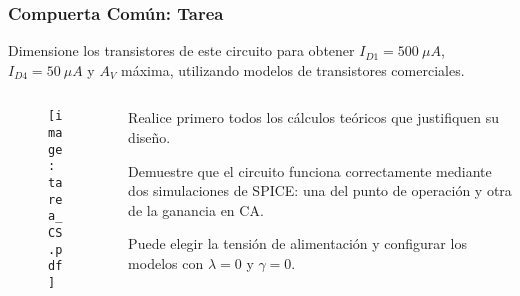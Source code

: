 \begin{frame}[t]
    \frametitle{Compuerta Común: Tarea}

    Dimensione los transistores de este circuito para obtener $I_{D1} = 500\ \mu A$, $I_{D4} = 50\ \mu A$ y $A_V$ máxima, utilizando modelos de transistores comerciales.

    \begin{columns}
        \begin{column}{0.65\textwidth}
            \begin{figure}[H]
                \centering
                \texttt{[image: tarea\_CS.pdf]}
            \end{figure}            
        \end{column}
        \begin{column}{0.35\textwidth}
            Realice primero todos los cálculos teóricos que justifiquen su diseño.

            \vspace{3mm}
            Demuestre que el circuito funciona correctamente mediante dos simulaciones de SPICE: una del punto de operación y otra de la ganancia en CA.

            \vspace{3mm}
            Puede elegir la tensión de alimentación y configurar los modelos con $\lambda=0$ y $\gamma=0$.
        \end{column}
    \end{columns}

\end{frame}
